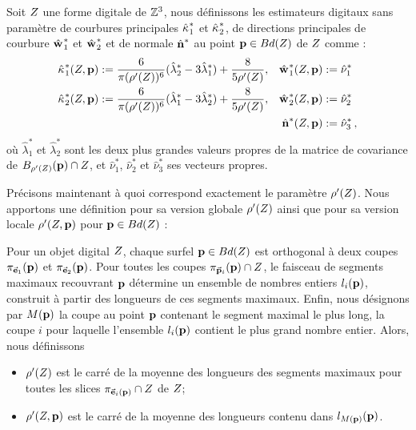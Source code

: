 \begin{definition}
  Soit $Z$ une forme digitale de $\mathbb{Z}^3$, nous définissons les estimateurs
  digitaux sans paramètre de courbures principales $\hat{\kappa_{}}_{1}^{*}$ et
  $\hat{\kappa_{}}_{2}^{*}$, de directions principales de courbure $\hat{\mathbf{w}_{}}_{1}^{*}$ et
  $\hat{\mathbf{w}_{}}_{2}^{*}$ et de normale $\hat{\mathbf{n}{}}^{*}$ au point $\mathbf{p} \in
  Bd({Z})$ de $Z$ comme :
  \begin{align}
      \hat{\kappa_{}}_{1}^{*}(Z, \mathbf{p})  &:= \frac{6}{\pi (\rho'(Z))^6}(\hat{\lambda}^{*}_2 - 3\hat{\lambda}^{*}_1) + \frac{8}{5 \rho'(Z)},
      &\hat{\mathbf{w}_{}}_{1}^{*}(Z, \mathbf{p}) &:= \hat{\nu}^{*}_1 \\
      \hat{\kappa_{}}_{2}^{*}(Z, \mathbf{p}) &:= \frac{6}{\pi (\rho'(Z))^6}(\hat{\lambda}^{*}_1 - 3\hat{\lambda}^{*}_2) + \frac{8}{5 \rho'(Z)},
      &\hat{\mathbf{w}_{}}_{2}^{*}(Z, \mathbf{p}) &:= \hat{\nu}^{*}_2\\
      & &\hat{\mathbf{n}{}}^{*}(Z, \mathbf{p}) &:=\hat{\nu}^{*}_3\,,
  \end{align}
  où $\hat{\lambda}^{*}_1$ et $\hat{\lambda}^{*}_2$ sont les deux plus grandes
  valeurs propres de la matrice de covariance de $B_{{\rho'(Z)}}(\mathbf{p})
  \cap Z$, et $ \hat{\nu}^{*}_1$, $\hat{\nu}^{*}_2$ et $\hat{\nu}^{*}_3$
  ses vecteurs propres.
  \label{def:curvature-estimator-3d-k1k2-pf}
\end{definition}
%
Précisons maintenant à quoi correspond exactement le paramètre
$\rho'(Z)$. Nous apportons une définition pour sa version globale
$\rho'(Z)$ ainsi que pour sa version locale $\rho'(Z, \mathbf{p})$ pour
$\mathbf{p} \in Bd({Z})$ :
%
\begin{definition}
  Pour un objet digital $Z$, chaque surfel $\mathbf{p} \in Bd({Z})$ est
  orthogonal à deux coupes $\pi_{\vec{\mathbf{e}}_1}(\mathbf{p})$ et $\pi_{\vec{\mathbf{e}}_2}(\mathbf{p})$.
  Pour toutes les coupes $\pi_{\vec{\mathbf{p}}_i}(\mathbf{p}) \cap Z$, le faisceau de
  segments maximaux recouvrant $\mathbf{p}$ détermine un ensemble de nombres entiers
  $l_i(\mathbf{p})$, construit à partir des longueurs de ces segments maximaux. Enfin,
  nous désignons par $M(\mathbf{p})$ la coupe au point $\mathbf{p}$ contenant le segment
  maximal le plus long, \cad la coupe $i$ pour laquelle l'ensemble $l_i(\mathbf{p})$
  contient le plus grand nombre entier. Alors, nous définissons
  \begin{itemize}
    \item $\rho'(Z)$ est le carré de la moyenne des longueurs des segments maximaux pour toutes les slices $\pi_{\vec{\mathbf{e}}_i(\mathbf{p})} \cap Z$ de $Z$;
    \item $\rho'(Z, \mathbf{p})$ est le carré de la moyenne des longueurs contenu dans $l_{M(\mathbf{p})}(\mathbf{p})$.
  \end{itemize}
\end{definition}

